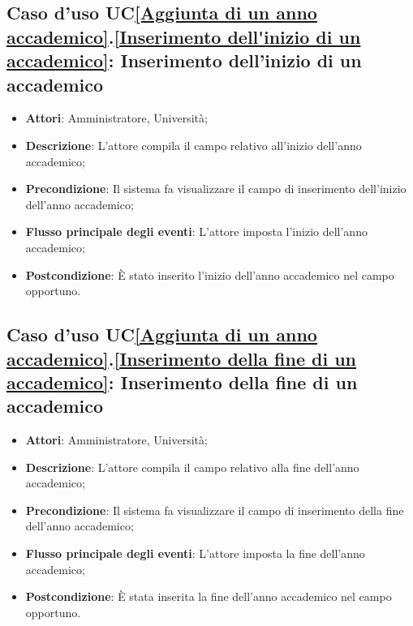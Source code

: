 \subsection{Caso d'uso UC\ref{Aggiunta di un anno accademico}.\ref{Inserimento dell'inizio di un accademico}: Inserimento dell'inizio di un accademico}
\begin{itemize}
	\item \textbf{Attori}: Amministratore, Università;
	\item \textbf{Descrizione}: L'attore compila il campo relativo all'inizio dell'anno accademico;
	\item \textbf{Precondizione}: Il sistema fa visualizzare il campo di inserimento dell'inizio dell'anno accademico;
	\item \textbf{Flusso principale degli eventi}: L'attore imposta l'inizio dell'anno accademico;
	\item \textbf{Postcondizione}: È stato inserito l'inizio dell'anno accademico nel campo opportuno.
\end{itemize}

\subsection{Caso d'uso UC\ref{Aggiunta di un anno accademico}.\ref{Inserimento della fine di un accademico}: Inserimento della fine di un accademico}
\begin{itemize}
	\item \textbf{Attori}: Amministratore, Università;
	\item \textbf{Descrizione}: L'attore compila il campo relativo alla fine dell'anno accademico;
	\item \textbf{Precondizione}: Il sistema fa visualizzare il campo di inserimento della fine dell'anno accademico;
	\item \textbf{Flusso principale degli eventi}: L'attore imposta la fine dell'anno accademico;
	\item \textbf{Postcondizione}: È stata inserita la fine dell'anno accademico nel campo opportuno.
\end{itemize}

